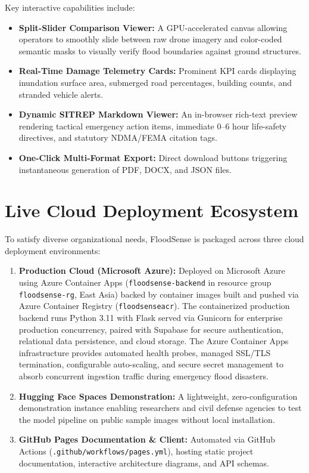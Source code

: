 Key interactive capabilities include:
\begin{itemize}
    \item \textbf{Split-Slider Comparison Viewer:} A GPU-accelerated canvas allowing operators to smoothly slide between raw drone imagery and color-coded semantic masks to visually verify flood boundaries against ground structures.
    \item \textbf{Real-Time Damage Telemetry Cards:} Prominent KPI cards displaying inundation surface area, submerged road percentages, building counts, and stranded vehicle alerts.
    \item \textbf{Dynamic SITREP Markdown Viewer:} An in-browser rich-text preview rendering tactical emergency action items, immediate 0--6 hour life-safety directives, and statutory NDMA/FEMA citation tags.
    \item \textbf{One-Click Multi-Format Export:} Direct download buttons triggering instantaneous generation of PDF, DOCX, and JSON files.
\end{itemize}

\section{Live Cloud Deployment Ecosystem}
To satisfy diverse organizational needs, FloodSense is packaged across three cloud deployment environments:
\begin{enumerate}
    \item \textbf{Production Cloud (Microsoft Azure):} Deployed on Microsoft Azure using Azure Container Apps (\texttt{floodsense-backend} in resource group \texttt{floodsense-rg}, East Asia) backed by container images built and pushed via Azure Container Registry (\texttt{floodsenseacr}). The containerized production backend runs Python 3.11 with Flask served via Gunicorn for enterprise production concurrency, paired with Supabase for secure authentication, relational data persistence, and cloud storage. The Azure Container Apps infrastructure provides automated health probes, managed SSL/TLS termination, configurable auto-scaling, and secure secret management to absorb concurrent ingestion traffic during emergency flood disasters.
    \item \textbf{Hugging Face Spaces Demonstration:} A lightweight, zero-configuration demonstration instance enabling researchers and civil defense agencies to test the model pipeline on public sample images without local installation.
    \item \textbf{GitHub Pages Documentation \& Client:} Automated via GitHub Actions (\texttt{.github/workflows/pages.yml}), hosting static project documentation, interactive architecture diagrams, and API schemas.
\end{enumerate}

